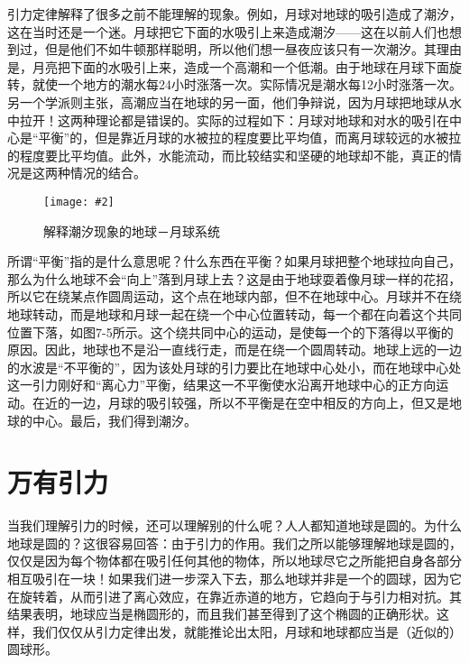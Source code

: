 \documentclass[12pt,oneside]{book}
\newenvironment{fig}[2][1]
{\begin{figure}[H]
\centering
\texttt{[image: \#2]}}
{\end{figure}}
\begin{document}
引力定律解释了很多之前不能理解的现象。例如，月球对地球的吸引造成了潮汐，这在当时还是一个迷。月球把它下面的水吸引上来造成潮汐——这在以前人们也想到过，但是他们不如牛顿那样聪明，所以他们想一昼夜应该只有一次潮汐。其理由是，月亮把下面的水吸引上来，造成一个高潮和一个低潮。由于地球在月球下面旋转，就使一个地方的潮水每24小时涨落一次。实际情况是潮水每12小时涨落一次。另一个学派则主张，高潮应当在地球的另一面，他们争辩说，因为月球把地球从水中拉开！这两种理论都是错误的。实际的过程如下：月球对地球和对水的吸引在中心是“平衡”的，但是靠近月球的水被拉的程度要比平均值，而离月球较远的水被拉的程度要比平均值。此外，水能流动，而比较结实和坚硬的地球却不能，真正的情况是这两种情况的结合。
\begin{fig}{解释潮汐现象的地球－月球系统}
\caption{解释潮汐现象的地球－月球系统}
\label{fig:解释潮汐现象的地球－月球系统}
\end{fig}

所谓“平衡”指的是什么意思呢？什么东西在平衡？如果月球把整个地球拉向自己，那么为什么地球不会“向上”落到月球上去？这是由于地球耍着像月球一样的花招，所以它在绕某点作圆周运动，这个点在地球内部，但不在地球中心。月球并不在绕地球转动，而是地球和月球一起在绕一个中心位置转动，每一个都在向着这个共同位置下落，如图7-5所示。这个绕共同中心的运动，是使每一个的下落得以平衡的原因。因此，地球也不是沿一直线行走，而是在绕一个圆周转动。地球上远的一边的水波是“不平衡的”，因为该处月球的引力要比在地球中心处小，而在地球中心处这一引力刚好和“离心力”平衡，结果这一不平衡使水沿离开地球中心的正方向运动。在近的一边，月球的吸引较强，所以不平衡是在空中相反的方向上，但又是地球的中心。最后，我们得到潮汐。



\section{万有引力}
当我们理解引力的时候，还可以理解别的什么呢？人人都知道地球是圆的。为什么地球是圆的？这很容易回答：由于引力的作用。我们之所以能够理解地球是圆的，仅仅是因为每个物体都在吸引任何其他的物体，所以地球尽它之所能把自身各部分相互吸引在一块！如果我们进一步深入下去，那么地球并非是一个的圆球，因为它在旋转着，从而引进了离心效应，在靠近赤道的地方，它趋向于与引力相对抗。其结果表明，地球应当是椭圆形的，而且我们甚至得到了这个椭圆的正确形状。这样，我们仅仅从引力定律出发，就能推论出太阳，月球和地球都应当是（近似的）圆球形。
\end{document}
